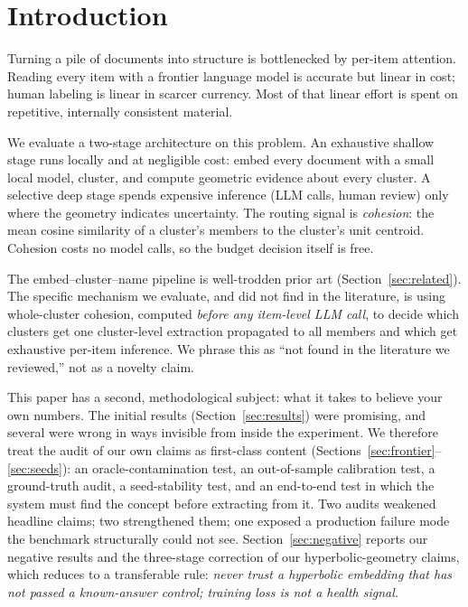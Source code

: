 \documentclass[11pt]{article}
\begin{document}
\section{Introduction}

Turning a pile of documents into structure is bottlenecked by per-item attention. Reading every item with a frontier language model is accurate but linear in cost; human labeling is linear in scarcer currency. Most of that linear effort is spent on repetitive, internally consistent material.

We evaluate a two-stage architecture on this problem. An exhaustive shallow stage runs locally and at negligible cost: embed every document with a small local model, cluster, and compute geometric evidence about every cluster. A selective deep stage spends expensive inference (LLM calls, human review) only where the geometry indicates uncertainty. The routing signal is \emph{cohesion}: the mean cosine similarity of a cluster's members to the cluster's unit centroid. Cohesion costs no model calls, so the budget decision itself is free.

The embed--cluster--name pipeline is well-trodden prior art (Section~\ref{sec:related}). The specific mechanism we evaluate, and did not find in the literature, is using whole-cluster cohesion, computed \emph{before any item-level LLM call}, to decide which clusters get one cluster-level extraction propagated to all members and which get exhaustive per-item inference. We phrase this as ``not found in the literature we reviewed,'' not as a novelty claim.

This paper has a second, methodological subject: what it takes to believe your own numbers. The initial results (Section~\ref{sec:results}) were promising, and several were wrong in ways invisible from inside the experiment. We therefore treat the audit of our own claims as first-class content (Sections~\ref{sec:frontier}--\ref{sec:seeds}): an oracle-contamination test, an out-of-sample calibration test, a ground-truth audit, a seed-stability test, and an end-to-end test in which the system must find the concept before extracting from it. Two audits weakened headline claims; two strengthened them; one exposed a production failure mode the benchmark structurally could not see. Section~\ref{sec:negative} reports our negative results and the three-stage correction of our hyperbolic-geometry claims, which reduces to a transferable rule: \emph{never trust a hyperbolic embedding that has not passed a known-answer control; training loss is not a health signal.}
\end{document}
